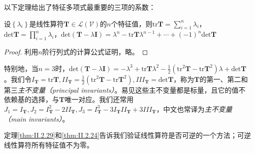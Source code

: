 \documentclass[main.tex]{subfiles}
\begin{document}
以下定理\cite[\S 5.1 性质1.1、1.2]{周胜林2012线性代数}给出了特征多项式最重要的三项的系数：

\begin{theorem}\label{thm:II.2.29}
    设$\left\{\lambda_i\right\}$是线性算符$\mathbf{T}\in\mathcal{L}\left(\mathcal{V}\right)$的$n$个特征值，则$\mathrm{tr}\mathbf{T}=\sum_{i=1}^n\lambda_i$，$\mathrm{det}\mathbf{T}=\prod_{i=1}^n\lambda_i$，$\mathrm{det}\left(\mathbf{T}-\lambda\mathbf{I}\right)=\lambda^n-\mathrm{tr}\mathbf{T}\lambda^{n-1}+\cdots+\left(-1\right)^n\mathrm{det}\mathbf{T}$
\end{theorem}
\begin{proof}
    利用$n$阶行列式的计算公式证明，略。
\end{proof}

特别地，当$n=3$时，$\mathrm{det}\left(\mathbf{T}-\lambda\mathbf{I}\right)=-\lambda^3+\mathrm{tr}\mathbf{T}\lambda^2-\frac{1}{2}\left(\mathrm{tr}^2\mathbf{T}-\mathrm{tr}\mathbf{T}^2\right)\lambda+\mathrm{det}\mathbf{T}$。我们令$I_\mathbf{T}=\mathrm{tr}\mathbf{T},II_\mathbf{T}=\frac{1}{2}\left(\mathrm{tr}^2\mathbf{T}-\mathrm{tr}\mathbf{T}^2\right),III_\mathbf{T}=\mathrm{det}\mathbf{T}$，称为$\mathbf{T}$的第一、第二和第三\emph{主不变量（principal invariants）}。易见这些主不变量都是标量，且它的值不依赖基的选择，与$\mathbf{T}$唯一对应。我们还常用$J_1=I_\mathbf{T},J_2=I_\mathbf{T}^2-2II_\mathbf{T},J_3=I_\mathbf{T}^3-3I_\mathbf{T}II_\mathbf{T}+3III_\mathbf{T}$，中文也常译为\emph{主不变量（main invariants）}。

定理\ref{thm:II.2.29}和\ref{thm:II.2.24}告诉我们验证线性算符是否可逆的一个方法；可逆线性算符所有特征值不为零。
\end{document}
